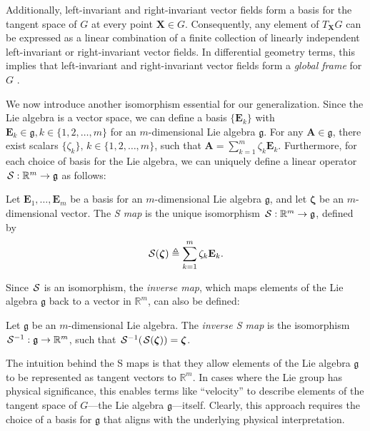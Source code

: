 Additionally, left-invariant and right-invariant vector fields form a basis for the tangent space of $G$ at every point $\mathbf{X} \in G$. Consequently, any element of $T_\mathbf{X}G$ can be expressed as a linear combination of a finite collection of linearly independent left-invariant or right-invariant vector fields. In differential geometry terms, this implies that left-invariant and right-invariant vector fields form a \emph{global frame} for $G$ \citep[p. 192]{Lee2012}.

We now introduce another isomorphism essential for our generalization. Since the Lie algebra is a vector space, we can define a basis $\{\mathbf{E}_k\}$ with $\mathbf{E}_k\in\mathfrak{g}, k\in\{1,2,\dots,m\}$ for an $m$-dimensional Lie algebra $\mathfrak{g}$. For any $\mathbf{A} \in\mathfrak{g}$, there exist scalars $\{\zeta_k\},\, k\in \{1,2,\dots,m\}$, such that $\mathbf{A} = \sum_{k=1}^{m} \zeta_k\mathbf{E}_k$. Furthermore, for each choice of basis for the Lie algebra, we can uniquely define a linear operator $\SL:\mathbb{R}^{m}\to\mathfrak{g}$ as follows:
\begin{definition}[S map]\label{def:SL-left-isomorphism-act-on-xi}
    Let $\mathbf{E}_1,\dots,\mathbf{E}_m$ be a basis for an $m$-dimensional Lie algebra $\mathfrak{g}$, and let $\boldsymbol{\zeta}$ be an $m$-dimensional vector. The \emph{S map} is the unique isomorphism $\SL:\mathbb{R}^{m}\to\mathfrak{g}$, defined by
    \begin{align}
        \SL[\boldsymbol{\zeta}] \triangleq \sum_{k=1}^m\zeta_k\mathbf{E}_k.    
    \end{align}
\end{definition}
Since $\SL$ is an isomorphism, the \emph{inverse map}, which maps elements of the Lie algebra $\mathfrak{g}$ back to a vector in $\mathbb{R}^m$, can also be defined:
\begin{definition}\label{def:inverse-isomorphism-SLinv}
    Let $\mathfrak{g}$ be an $m$-dimensional Lie algebra. The \emph{inverse S map} is the isomorphism $\invSL:\mathfrak{g}\to\mathbb{R}^m$, such that $\invSL[\SL[\boldsymbol{\zeta}]] = \boldsymbol{\zeta}$. 
\end{definition}
The intuition behind the S maps is that they allow elements of the Lie algebra $\mathfrak{g}$ to be represented as tangent vectors to $\mathbb{R}^m$. In cases where the Lie group has physical significance, this enables terms like ``velocity'' to describe elements of the tangent space of $G$---the Lie algebra $\mathfrak{g}$---itself. Clearly, this approach requires the choice of a basis for $\mathfrak{g}$ that aligns with the underlying physical interpretation.
